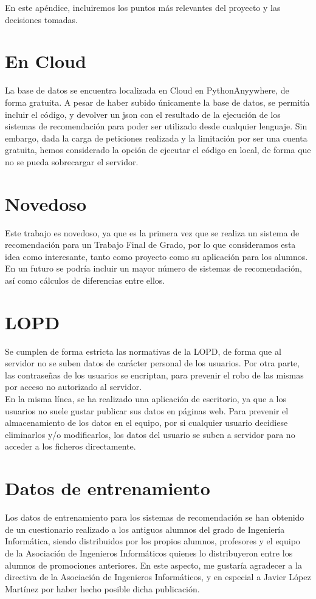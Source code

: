 En este apéndice, incluiremos los puntos más relevantes del proyecto y las decisiones tomadas. 
\section{En Cloud}
La base de datos se encuentra localizada en Cloud en PythonAnyywhere, de forma gratuita. A pesar de haber subido únicamente la base de datos, se permitía incluir el código, y devolver un json con el resultado de la ejecución de los sistemas de recomendación para poder ser utilizado desde cualquier lenguaje. Sin embargo, dada la carga de peticiones realizada y la limitación por ser una cuenta gratuita, hemos considerado la opción de ejecutar el código en local, de forma que no se pueda sobrecargar el servidor. 

\section{Novedoso}
Este trabajo es novedoso, ya que es la primera vez que se realiza un sistema de recomendación para un Trabajo Final de Grado, por lo que consideramos esta idea como interesante, tanto como proyecto como su aplicación para los alumnos.  En un futuro se podría incluir un mayor número de sistemas de recomendación, así como cálculos de diferencias entre ellos. 

\section{LOPD}
Se cumplen de forma estricta las normativas de la LOPD, de forma que al servidor no se suben datos de carácter personal de los usuarios. Por otra parte, las contraseñas de los usuarios se encriptan, para prevenir el robo de las mismas por acceso no autorizado al servidor. 
\\En la misma línea, se ha realizado una aplicación de escritorio, ya que a los usuarios no suele gustar publicar sus datos en páginas web. Para prevenir el almacenamiento de los datos en el equipo, por si cualquier usuario decidiese eliminarlos y/o modificarlos, los datos del usuario se suben a servidor para no acceder a los ficheros directamente. 


\section{Datos de entrenamiento}
Los datos de entrenamiento para los sistemas de recomendación se han obtenido de un cuestionario realizado a los antiguos alumnos del grado de Ingeniería Informática, siendo distribuidos por los propios alumnos, profesores y el equipo de la Asociación de Ingenieros Informáticos quienes lo distribuyeron entre los alumnos de promociones anteriores. En este aspecto, me gustaría agradecer a la directiva de la Asociación de Ingenieros Informáticos, y en especial a  Javier López Martínez  por haber hecho posible dicha publicación. 




